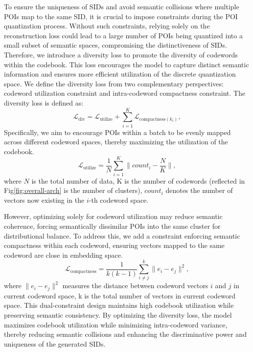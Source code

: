 To ensure the uniqueness of SIDs and avoid semantic collisions where multiple POIs map to the same SID, it is crucial to impose constraints during the POI quantization process. 
Without such constraints, relying solely on the reconstruction loss could lead to a large number of POIs being quantized into a small subset of semantic spaces, compromising the distinctiveness of SIDs. 
Therefore, we introduce a diversity loss to promote the diversity of codewords within the codebook. 
This loss encourages the model to capture distinct semantic information and ensures more efficient utilization of the discrete quantization space. 
We define the diversity loss from two complementary perspectives: codeword utilization constraint and intra-codeword compactness constraint.
The diversity loss is defined as:
\begin{equation}
\mathcal{L}_{\text{div}} = \mathcal{L}_{\text{utilize}} + \sum_{i=1}^{K}\mathcal{L}_{\text{compactness}(k_i)},
\label{equ:diversity-loss}
\end{equation}
Specifically, we aim to encourage POIs within a batch to be evenly mapped across different codeword spaces, thereby maximizing the utilization of the codebook. 
\begin{equation}
\mathcal{L}_{\text{utilize}} = \frac{1}{N}\sum_{i=1}^{K}\| count_i-\frac{N}{K} \|,
\end{equation}
where $N$ is the total number of data, K is the number of codewords (reflected in Fig\ref{fig:overall-arch} is the number of clusters), $count_i$ denotes the number of vectors now existing in the $i$-th codeword space.

However, optimizing solely for codeword utilization may reduce semantic coherence, forcing semantically dissimilar POIs into the same cluster for distributional balance. 
To address this, we add a constraint enforcing semantic compactness within each codeword, ensuring vectors mapped to the same codeword are close in embedding space. 
\begin{equation}
\mathcal{L}_{\text{compactness}} = \frac{1}{k{(k-1)}} \sum_{i \neq j}^{k} \| e_i - e_j \|^2,
\end{equation}
where $\| e_i - e_j \|^2$ measures the distance between codeword vectors $i$ and $j$ in current codeword space, k is the total number of vectors in current codeword space. 
This dual-constraint design maintains high codebook utilization while preserving semantic consistency.  
By optimizing the diversity loss, the model maximizes codebook utilization while minimizing intra-codeword variance, thereby reducing semantic collisions and enhancing the discriminative power and uniqueness of the generated SIDs.
 
